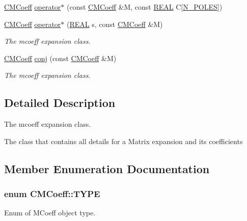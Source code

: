 \begin{DoxyCompactItemize}
\hyperlink{classCMCoeff}{C\-M\-Coeff} \hyperlink{classCMCoeff_a794db3eaa0d9cf84e4c8ca1023e4f54a}{operator$\ast$} (const \hyperlink{classCMCoeff}{C\-M\-Coeff} \&M, const \hyperlink{util_8h_a5821460e95a0800cf9f24c38915cbbde}{R\-E\-A\-L} C\mbox{[}\hyperlink{mcoeff_8h_ac23f9c13c5d07d9ce386f7a830c35e5a}{N\-\_\-\-P\-O\-L\-E\-S}\mbox{]})
\item 
\hyperlink{classCMCoeff}{C\-M\-Coeff} \hyperlink{classCMCoeff_a4bebac156440468c712dfce37bc9fc7c}{operator$\ast$} (\hyperlink{util_8h_a5821460e95a0800cf9f24c38915cbbde}{R\-E\-A\-L} s, const \hyperlink{classCMCoeff}{C\-M\-Coeff} \&M)
\begin{DoxyCompactList}\small\item\em The mcoeff expansion class. \end{DoxyCompactList}\item 
\hyperlink{classCMCoeff}{C\-M\-Coeff} \hyperlink{classCMCoeff_a33f855dbf0c86d35853f618e3494db87}{conj} (const \hyperlink{classCMCoeff}{C\-M\-Coeff} \&M)
\begin{DoxyCompactList}\small\item\em The mcoeff expansion class. \end{DoxyCompactList}\end{DoxyCompactItemize}


\subsection{Detailed Description}
The mcoeff expansion class. 

The class that contains all details for a Matrix expansion and its coefficients 

\subsection{Member Enumeration Documentation}
\hypertarget{classCMCoeff_a0b490eeb5ba86bc1a95ea1c3b2946478}{
\subsubsection[{T\-Y\-P\-E}]{\setlength{\rightskip}{0pt plus 5cm}enum {\bf C\-M\-Coeff\-::\-T\-Y\-P\-E}}}\label{classCMCoeff_a0b490eeb5ba86bc1a95ea1c3b2946478}


Enum of M\-Coeff object type. 

